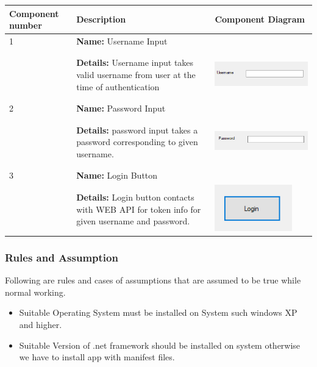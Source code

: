 \documentclass[12pt]{article}
\begin{document}
\begin{center}
 \begin{longtable}{|p{2cm}|p{9cm}|p{4cm}|} 
 \hline
 Component number & Description & Component Diagram \\ [0.5ex] 
 \hline
\hline 
1&\textbf{Name:} Username Input\\&\textbf{Details:} Username input takes valid username from user at the time of authentication& \begin{minipage}{.3\textwidth}
      \includegraphics[width=\linewidth, height=20mm]{usernameinput}
    \end{minipage}\\
\hline
 2 &
  \textbf{Name:} Password Input\\&
\textbf{Details:} password input takes a password corresponding to given username.& \begin{minipage}{.3\textwidth}
      \includegraphics[width=\linewidth, height=20mm]{passwordinput}
    \end{minipage}\\
 \hline 3 &
  \textbf{Name:} Login Button\\&
\textbf{Details:} Login button contacts with WEB API for token info for given username and password.&\begin{minipage}{.3\textwidth}
      \includegraphics[width=\linewidth, height=20mm]{loginbutton}
    \end{minipage}\\
 \hline     
\end{longtable}
\end{center}

\subsubsection{Rules and Assumption}
Following are rules and cases of assumptions that are assumed to be true while normal working.
\begin{itemize}
\item Suitable Operating System must be installed on System such windows XP and higher.
\item Suitable Version of .net framework should be installed on system otherwise we have to install app with manifest files.
\end{itemize}
\end{document}
